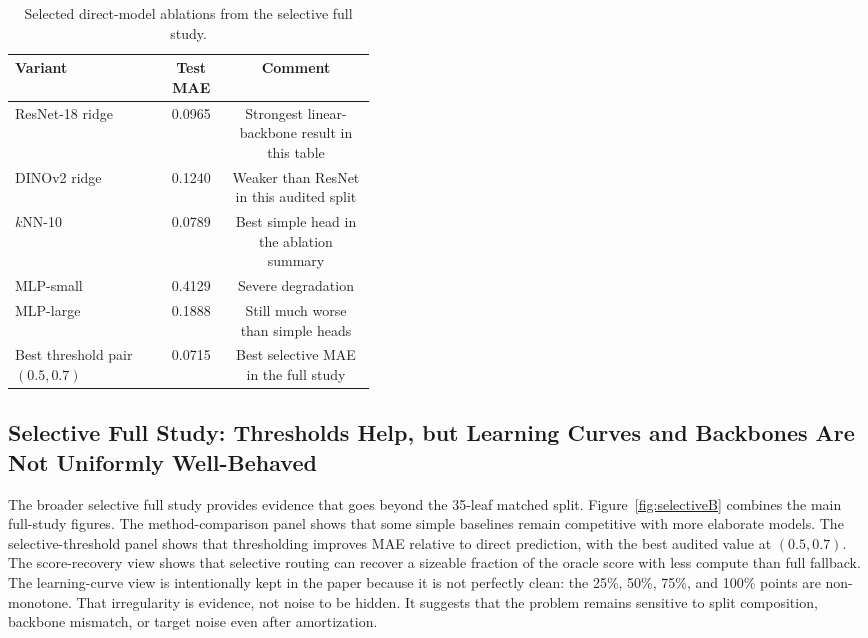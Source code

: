 \documentclass[11pt,a4paper]{article}
\begin{document}
\begin{table}[H]
\centering
\caption{Selected direct-model ablations from the selective full study.}
\label{tab:ablationB}
\small
\begin{tabular}{p{0.42\linewidth}cc}
\toprule
Variant & Test MAE & Comment \\
\midrule
ResNet-18 ridge & 0.0965 & Strongest linear-backbone result in this table \\
DINOv2 ridge & 0.1240 & Weaker than ResNet in this audited split \\
$k$NN-10 & 0.0789 & Best simple head in the ablation summary \\
MLP-small & 0.4129 & Severe degradation \\
MLP-large & 0.1888 & Still much worse than simple heads \\
Best threshold pair $(0.5,0.7)$ & 0.0715 & Best selective MAE in the full study \\
\bottomrule
\end{tabular}
\end{table}

\subsection{Selective Full Study: Thresholds Help, but Learning Curves and Backbones Are Not Uniformly Well-Behaved}
The broader selective full study provides evidence that goes beyond the 35-leaf matched split.
Figure~\ref{fig:selectiveB} combines the main full-study figures.
The method-comparison panel shows that some simple baselines remain competitive with more elaborate models.
The selective-threshold panel shows that thresholding improves MAE relative to direct prediction, with the best audited value at $(0.5,0.7)$.
The score-recovery view shows that selective routing can recover a sizeable fraction of the oracle score with less compute than full fallback.
The learning-curve view is intentionally kept in the paper because it is not perfectly clean: the 25\%, 50\%, 75\%, and 100\% points are non-monotone.
That irregularity is evidence, not noise to be hidden.
It suggests that the problem remains sensitive to split composition, backbone mismatch, or target noise even after amortization.
\end{document}
